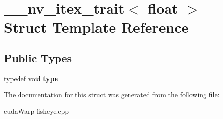 \hypertarget{struct____nv__itex__trait_3_01float_01_4}{}\section{\+\_\+\+\_\+nv\+\_\+itex\+\_\+trait$<$ float $>$ Struct Template Reference}
\label{struct____nv__itex__trait_3_01float_01_4}
\subsection*{Public Types}
\begin{DoxyCompactItemize}
\item 
typedef void {\bfseries type}\hypertarget{struct____nv__itex__trait_3_01float_01_4_a80e79f1eb957b2b18edf96e5220d03d1}{}\label{struct____nv__itex__trait_3_01float_01_4_a80e79f1eb957b2b18edf96e5220d03d1}

\end{DoxyCompactItemize}


The documentation for this struct was generated from the following file\+:\begin{DoxyCompactItemize}
\item 
cuda\+Warp-\/fisheye.\+cpp\end{DoxyCompactItemize}
